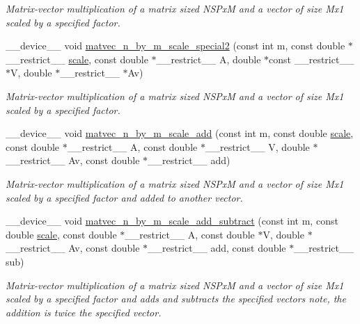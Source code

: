 \begin{DoxyCompactItemize}
\begin{DoxyCompactList}\small\item\em Matrix-\/vector multiplication of a matrix sized N\+S\+PxM and a vector of size Mx1 scaled by a specified factor. \end{DoxyCompactList}\item 
\+\_\+\+\_\+device\+\_\+\+\_\+ void \hyperlink{exponential__linear__algebra_8cu_a6d511f330da8ea1a044ed327a132d290}{matvec\+\_\+n\+\_\+by\+\_\+m\+\_\+scale\+\_\+special2} (const int m, const double $\ast$\+\_\+\+\_\+restrict\+\_\+\+\_\+ \hyperlink{radau2a_8cu_a4fab5866449108992478041d2e51a28c}{scale}, const double $\ast$\+\_\+\+\_\+restrict\+\_\+\+\_\+ A, double $\ast$const \+\_\+\+\_\+restrict\+\_\+\+\_\+ $\ast$V, double $\ast$\+\_\+\+\_\+restrict\+\_\+\+\_\+ $\ast$Av)
\begin{DoxyCompactList}\small\item\em Matrix-\/vector multiplication of a matrix sized N\+S\+PxM and a vector of size Mx1 scaled by a specified factor. \end{DoxyCompactList}\item 
\+\_\+\+\_\+device\+\_\+\+\_\+ void \hyperlink{exponential__linear__algebra_8cu_a03a4bb64bc60aab5af9a5f5b40205ede}{matvec\+\_\+n\+\_\+by\+\_\+m\+\_\+scale\+\_\+add} (const int m, const double \hyperlink{radau2a_8cu_a4fab5866449108992478041d2e51a28c}{scale}, const double $\ast$\+\_\+\+\_\+restrict\+\_\+\+\_\+ A, const double $\ast$\+\_\+\+\_\+restrict\+\_\+\+\_\+ V, double $\ast$\+\_\+\+\_\+restrict\+\_\+\+\_\+ Av, const double $\ast$\+\_\+\+\_\+restrict\+\_\+\+\_\+ add)
\begin{DoxyCompactList}\small\item\em Matrix-\/vector multiplication of a matrix sized N\+S\+PxM and a vector of size Mx1 scaled by a specified factor and added to another vector. \end{DoxyCompactList}\item 
\+\_\+\+\_\+device\+\_\+\+\_\+ void \hyperlink{exponential__linear__algebra_8cu_a0522be133cda40ce325a2af6d95daddb}{matvec\+\_\+n\+\_\+by\+\_\+m\+\_\+scale\+\_\+add\+\_\+subtract} (const int m, const double \hyperlink{radau2a_8cu_a4fab5866449108992478041d2e51a28c}{scale}, const double $\ast$\+\_\+\+\_\+restrict\+\_\+\+\_\+ A, const double $\ast$V, double $\ast$\+\_\+\+\_\+restrict\+\_\+\+\_\+ Av, const double $\ast$\+\_\+\+\_\+restrict\+\_\+\+\_\+ add, const double $\ast$\+\_\+\+\_\+restrict\+\_\+\+\_\+ sub)
\begin{DoxyCompactList}\small\item\em Matrix-\/vector multiplication of a matrix sized N\+S\+PxM and a vector of size Mx1 scaled by a specified factor and adds and subtracts the specified vectors note, the addition is twice the specified vector. \end{DoxyCompactList}\item 

\end{DoxyCompactItemize}
